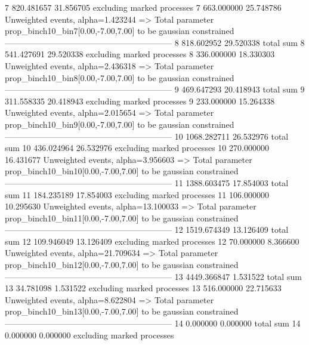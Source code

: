 7          820.481657      31.856705       excluding marked processes    
7          663.000000      25.748786       Unweighted events, alpha=1.423244
  => Total parameter prop_binch10_bin7[0.00,-7.00,7.00] to be gaussian constrained
------------------------------------------------------------
8          818.602952      29.520338       total sum                     
8          541.427691      29.520338       excluding marked processes    
8          336.000000      18.330303       Unweighted events, alpha=2.436318
  => Total parameter prop_binch10_bin8[0.00,-7.00,7.00] to be gaussian constrained
------------------------------------------------------------
9          469.647293      20.418943       total sum                     
9          311.558335      20.418943       excluding marked processes    
9          233.000000      15.264338       Unweighted events, alpha=2.015654
  => Total parameter prop_binch10_bin9[0.00,-7.00,7.00] to be gaussian constrained
------------------------------------------------------------
10         1068.282711     26.532976       total sum                     
10         436.024964      26.532976       excluding marked processes    
10         270.000000      16.431677       Unweighted events, alpha=3.956603
  => Total parameter prop_binch10_bin10[0.00,-7.00,7.00] to be gaussian constrained
------------------------------------------------------------
11         1388.603475     17.854003       total sum                     
11         184.235189      17.854003       excluding marked processes    
11         106.000000      10.295630       Unweighted events, alpha=13.100033
  => Total parameter prop_binch10_bin11[0.00,-7.00,7.00] to be gaussian constrained
------------------------------------------------------------
12         1519.674349     13.126409       total sum                     
12         109.946049      13.126409       excluding marked processes    
12         70.000000       8.366600        Unweighted events, alpha=21.709634
  => Total parameter prop_binch10_bin12[0.00,-7.00,7.00] to be gaussian constrained
------------------------------------------------------------
13         4449.366847     1.531522        total sum                     
13         34.781098       1.531522        excluding marked processes    
13         516.000000      22.715633       Unweighted events, alpha=8.622804
  => Total parameter prop_binch10_bin13[0.00,-7.00,7.00] to be gaussian constrained
------------------------------------------------------------
14         0.000000        0.000000        total sum                     
14         0.000000        0.000000        excluding marked processes    
